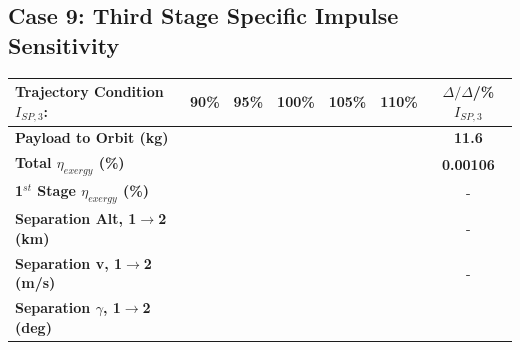\subsection{Case 9: Third Stage Specific Impulse Sensitivity}\label{sec:isp3NoReturn}

\begin{table}[ht] %

	\centering
	\begin{tabular}{l c c c c c c} 
		\hline \textbf{Trajectory Condition}   \qquad  $I_{SP,3}$:
		&90\%
		&95\%
		&100\%
		&105\%
		&110\%
		& $\Delta/\Delta$/\%$I_{SP,3}$
		\\
		\hline \textbf{Payload to Orbit (kg)}
		& \textbf{\PayloadToOrbitISPThreeNinetyNoReturn}
		& \textbf{\PayloadToOrbitISPThreeNinetyFiveNoReturn}
		& \textbf{\PayloadToOrbitISPThreeStandardNoReturn}
		& \textbf{\PayloadToOrbitISPThreeOneHundredFiveNoReturn}
		& \textbf{\PayloadToOrbitISPThreeOneHundredTenNoReturn}
		&\textbf{11.6}
		\\
		\textbf{Total $\eta_{exergy}$ (\%)}
		& \textbf{\totalExergyEffISPThreeNinetyNoReturn}
		& \textbf{\totalExergyEffISPThreeNinetyFiveNoReturn}
		& \textbf{\totalExergyEffISPThreeStandardNoReturn}
		& \textbf{\totalExergyEffISPThreeOneHundredFiveNoReturn}
		& \textbf{\totalExergyEffISPThreeOneHundredTenNoReturn}
		& \textbf{0.00106}
		\\
		\hline 
		\textbf{1$^{st}$ Stage $\eta_{exergy}$ (\%)}
		& \textbf{\firstExergyEffISPThreeNinetyNoReturn}
		& \textbf{\firstExergyEffISPThreeNinetyFiveNoReturn}
		& \textbf{\firstExergyEffISPThreeStandardNoReturn}
		& \textbf{\firstExergyEffISPThreeOneHundredFiveNoReturn}
		& \textbf{\firstExergyEffISPThreeOneHundredTenNoReturn}
		& -
		\\
		\textbf{Separation Alt, 1$\rightarrow$2 (km)}
		& \firstsecondSeparationAltISPThreeNinetyNoReturn
		& \firstsecondSeparationAltISPThreeNinetyFiveNoReturn
		& \firstsecondSeparationAltISPThreeStandardNoReturn
		& \firstsecondSeparationAltISPThreeOneHundredFiveNoReturn
		& \firstsecondSeparationAltISPThreeOneHundredTenNoReturn
		& -
		\\
		\textbf{Separation v, 1$\rightarrow$2 (m/s)}
		& \firstsecondSeparationvISPThreeNinetyNoReturn
		& \firstsecondSeparationvISPThreeNinetyFiveNoReturn
		& \firstsecondSeparationvISPThreeStandardNoReturn
		& \firstsecondSeparationvISPThreeOneHundredFiveNoReturn
		& \firstsecondSeparationvISPThreeOneHundredTenNoReturn
		& -
		\\
		\textbf{Separation $\gamma$, 1$\rightarrow$2 (deg)}

\end{tabular}
\end{table}

